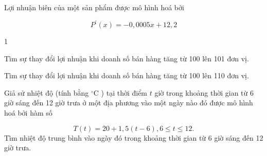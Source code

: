 \begin{vd}
	Lợi nhuận biên của một sản phẩm được mô hình hoá bởi
	
	$$
	P^{\prime}(x)=-0,0005 x+12,2
	$$
	\begin{enumEX}[a)]{1}
		\item Tìm sự thay đổi lợi nhuận khi doanh số bán hàng tăng từ 100 lên 101 đơn vị.
		\item Tìm sự thay đổi lợi nhuận khi doanh số bán hàng tăng từ 100 lên 110 đơn vị.
	\end{enumEX}
\end{vd}

\begin{vd}
	Giả sử nhiệt độ (tính bằng ${ }^{\circ} \mathrm{C}$ ) tại thời điểm $t$ giờ trong khoảng thời gian từ 6 giờ sáng đến 12 giờ trưa ở một địa phương vào một ngày nào đó được mô hình hoá bởi hàm số
	
	$$
	T(t)=20+1{,}5(t-6), 6 \leq t \leq 12 .
	$$
	Tìm nhiệt độ trung bình vào ngày đó trong khoảng thời gian từ 6 giờ sáng đến 12 giờ trưa.
\end{vd}

